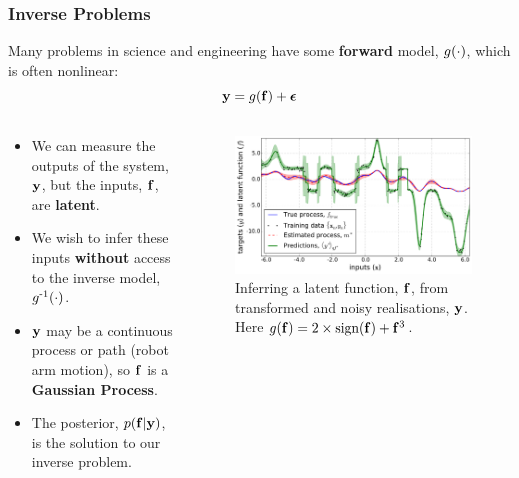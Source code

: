 \documentclass{beamer}
\begin{document}
\begin{frame}
    \frametitle{Inverse Problems}

Many problems in science and engineering have some \textbf{forward} 
model, $g\!\left({{\cdot}}\right)$, which is often nonlinear:
\begin{equation*}
    \mathbf{y} = g\!\left({{\mathbf{f}}}\right) + \boldsymbol\epsilon
\end{equation*}
\vspace{-6mm}
\begin{columns}

\begin{column}{0.5\linewidth}
\footnotesize

\begin{itemize}
    \item We can measure the outputs of the system, $\mathbf{y}$, but the inputs,
        $\mathbf{f}$, are \textbf{latent}.
    \item We wish to infer these inputs \textbf{without} access to the inverse
        model, $g^{\text{-}1}\!\left({{\cdot}}\right)$.
    \item $\mathbf{y}$ may be a continuous process or path (robot arm motion), 
        so $\mathbf{f}$ is a \textbf{Gaussian Process}.
    \item The posterior, $p\!\left({\mathbf{f}}\middle\vert{\ensuremath{\mathbf{y}}}\right)$, is the solution to our
        inverse problem.
\end{itemize}

\end{column}

\begin{column}{0.5\linewidth}

\begin{figure}
    \includegraphics[width=0.75\linewidth]{fig/signdemo}

    \caption{Inferring a latent function, $\mathbf{f}$, from transformed and noisy
        realisations, $\mathbf{y}$. Here $g\!\left({{\mathbf{f}}}\right) =
        2\times\text{sign}\!\left({\mathbf{f}}\right) + \mathbf{f}^3$.}


\end{figure}
\end{column}
\end{columns}
\end{frame}
\end{document}
